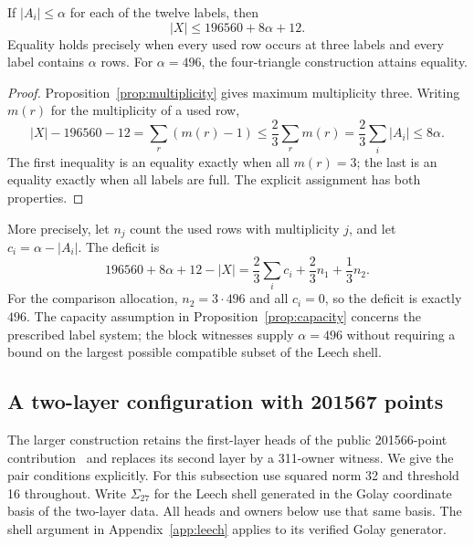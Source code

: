 \begin{proposition}\label{prop:capacity}
If $|A_i|\le\alpha$ for each of the twelve labels, then
\begin{equation}\label{eq:capacity}
 |X|\le196560+8\alpha+12.
\end{equation}
Equality holds precisely when every used row occurs at three labels
and every label contains $\alpha$ rows. For $\alpha=496$, the
four-triangle construction attains equality.
\end{proposition}
\begin{proof}
Proposition~\ref{prop:multiplicity} gives maximum multiplicity three.
Writing $m(r)$ for the multiplicity of a used row,
\[
 |X|-196560-12
 =\sum_r(m(r)-1)
 \le\frac23\sum_rm(r)
 =\frac23\sum_i|A_i|\le8\alpha.
\]
The first inequality is an equality exactly when all $m(r)=3$;
the last is an equality exactly when all labels are full. The explicit
assignment has both properties.
\end{proof}

More precisely, let $n_j$ count the used rows with multiplicity $j$,
and let $c_i=\alpha-|A_i|$. The deficit is
\begin{equation}\label{eq:deficit}
 196560+8\alpha+12-|X|
 =\frac23\sum_i c_i+\frac23n_1+\frac13n_2.
\end{equation}
For the comparison allocation, $n_2=3\cdot496$ and all $c_i=0$, so
the deficit is exactly $496$. The capacity assumption in
Proposition~\ref{prop:capacity} concerns the prescribed label system;
the block witnesses supply $\alpha=496$ without requiring a bound on
the largest possible compatible subset of the Leech shell.

\subsection{A two-layer configuration with 201567 points}
\label{sec:leech-two-layer}
The larger construction retains the first-layer heads of the public
201566-point contribution~\cite{lindow27} and replaces its second
layer by a 311-owner witness. We give the pair conditions explicitly.
For this subsection use squared norm 32 and threshold 16 throughout.
Write $\Sigma_{27}$ for the Leech shell generated in the Golay
coordinate basis of the two-layer data. All heads and owners below
use that same basis. The shell argument in Appendix~\ref{app:leech}
applies to its verified Golay generator.

